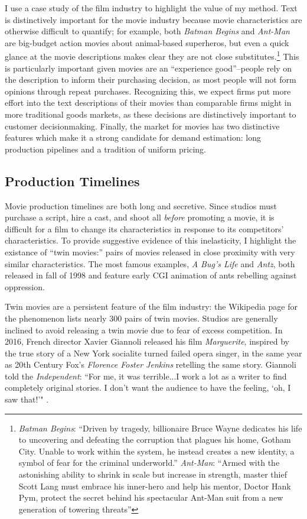 \documentclass{article}
\begin{document}
I use a case study of the film industry to highlight the value of my method. Text is distinctively important for the movie industry because movie characteristics are otherwise difficult to quantify; for example, both \emph{Batman Begins} and \emph{Ant-Man} are big-budget action movies about animal-based superheros, but even a quick glance at the movie descriptions makes clear they are not close substitutes.\footnote{\emph{Batman Begins}: ``Driven by tragedy, billionaire Bruce Wayne dedicates his life to uncovering and defeating the corruption that plagues his home, Gotham City. Unable to work within the system, he instead creates a new identity, a symbol of fear for the criminal underworld.'' \emph{Ant-Man}: ``Armed with the astonishing ability to shrink in scale but increase in strength, master thief Scott Lang must embrace his inner-hero and help his mentor, Doctor Hank Pym, protect the secret behind his spectacular Ant-Man suit from a new generation of towering threats''} This is particularly important given movies are an ``experience good''--people rely on the description to inform their purchasing decision, as most people will not form opinions through repeat purchases. Recognizing this, we expect firms put more effort into the text descriptions of their movies than comparable firms might in more traditional goods markets, as these decisions are distinctively important to customer decisionmaking. Finally, the market for movies has two distinctive features which make it a strong candidate for demand estimation: long production pipelines and a tradition of uniform pricing.

\subsection{Production Timelines}

Movie production timelines are both long and secretive. Since studios must purchase a script, hire a cast, and shoot all \emph{before} promoting a movie, it is difficult for a film to change its characteristics in response to its competitors' characteristics. To provide suggestive evidence of this inelasticity, I highlight the existance of ``twin movies:'' pairs of movies released in close proximity with very similar characteristics. The most famous examples, \emph{A Bug's Life} and \emph{Antz}, both released in fall of 1998 and feature early CGI animation of ants rebelling against oppression.

Twin movies are a persistent feature of the film industry: the Wikipedia page for the phenomenon lists nearly 300 pairs of twin movies. Studios are generally inclined to avoid releasing a twin movie due to fear of excess competition. In 2016, French director Xavier Giannoli released his film \emph{Marguerite}, inspired by the true story of a New York socialite turned failed opera singer, in the same year as 20th Century Fox's \emph{Florence Foster Jenkins} retelling the same story. Giannoli told the \emph{Independent}: ``For me, it was terrible...I work a lot as a writer to find completely original stories. I don't want the audience to have the feeling, `oh, I saw that!'" \parencite{mottram2016I}.
\end{document}
